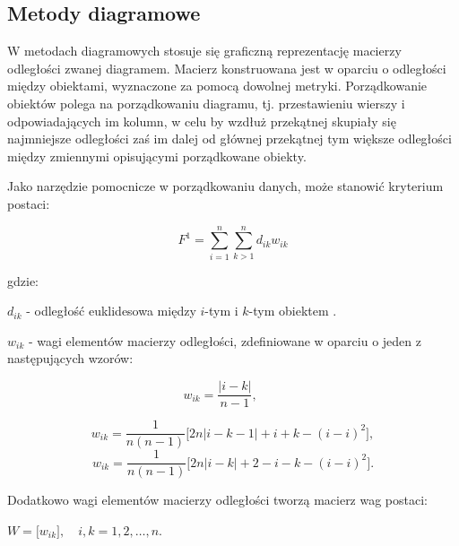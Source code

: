 \documentclass[12pt,a4paper]{report}
\begin{document}
\subsection{Metody diagramowe}


W metodach diagramowych stosuje się graficzną reprezentację macierzy odległości zwanej diagramem. Macierz konstruowana jest w oparciu o odległości między obiektami, wyznaczone za pomocą dowolnej metryki. Porządkowanie obiektów polega na porządkowaniu diagramu, tj. przestawieniu wierszy i odpowiadających im kolumn, w celu by wzdłuż przekątnej skupiały się najmniejsze odległości zaś im dalej od głównej przekątnej tym większe odległości między zmiennymi opisującymi porządkowane obiekty.  %

Jako narzędzie pomocnicze w porządkowaniu danych, może stanowić kryterium postaci:


$$
F^1= \sum_{i=1}^{n} \sum_{k>1}^{n} d_{ik}w_{ik}
$$

gdzie:

 $d_{ik}$ - odległość euklidesowa między $i$-tym i $k$-tym obiektem . 
 
 $w_{ik}$ - wagi elementów macierzy odległości, zdefiniowane w oparciu o jeden z następujących wzorów: 
 
$$
w_{ik}=\frac{| i-k |}{n-1}, \qquad
$$

$$
w_{ik}=\frac{1}{n(n-1)}\lbrack{2n|i-k-1|+i+k-(i-i)^2\rbrack},
$$
$$
w_{ik}=\frac{1}{n(n-1)}\lbrack{2n|i-k|+2-i-k-(i-i)^2\rbrack}.
$$
 


Dodatkowo wagi elementów macierzy odległości tworzą macierz wag postaci:

$W=\lbrack{w_{ik}\rbrack},\quad i,k=1, 2, \ldots, n.$
\end{document}
